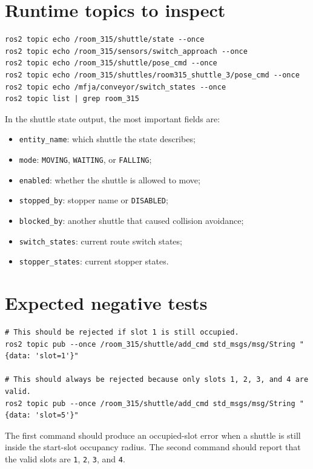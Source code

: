 \documentclass[12pt,a4paper]{report}
\newcommand{\codenext}[1]{\par\Needspace{#1\baselineskip}}
\begin{document}
\section{Runtime topics to inspect}

\codenext{10}
\begin{lstlisting}[style=terminalcode,caption={Runtime state and debug topics.}]
ros2 topic echo /room_315/shuttle/state --once
ros2 topic echo /room_315/sensors/switch_approach --once
ros2 topic echo /room_315/shuttle/pose_cmd --once
ros2 topic echo /room_315/shuttles/room315_shuttle_3/pose_cmd --once
ros2 topic echo /mfja/conveyor/switch_states --once
ros2 topic list | grep room_315
\end{lstlisting}

In the shuttle state output, the most important fields are:

\begin{itemize}
\item \texttt{entity\_name}: which shuttle the state describes;
\item \texttt{mode}: \texttt{MOVING}, \texttt{WAITING}, or \texttt{FALLING};
\item \texttt{enabled}: whether the shuttle is allowed to move;
\item \texttt{stopped\_by}: stopper name or \texttt{DISABLED};
\item \texttt{blocked\_by}: another shuttle that caused collision avoidance;
\item \texttt{switch\_states}: current route switch states;
\item \texttt{stopper\_states}: current stopper states.
\end{itemize}

\section{Expected negative tests}

\codenext{10}
\begin{lstlisting}[style=terminalcode,caption={Negative tests for start-slot rules.}]
# This should be rejected if slot 1 is still occupied.
ros2 topic pub --once /room_315/shuttle/add_cmd std_msgs/msg/String "{data: 'slot=1'}"

# This should always be rejected because only slots 1, 2, 3, and 4 are valid.
ros2 topic pub --once /room_315/shuttle/add_cmd std_msgs/msg/String "{data: 'slot=5'}"
\end{lstlisting}

The first command should produce an occupied-slot error when a shuttle is still
inside the start-slot occupancy radius. The second command should report that
the valid slots are \texttt{1}, \texttt{2}, \texttt{3}, and \texttt{4}.
\end{document}
